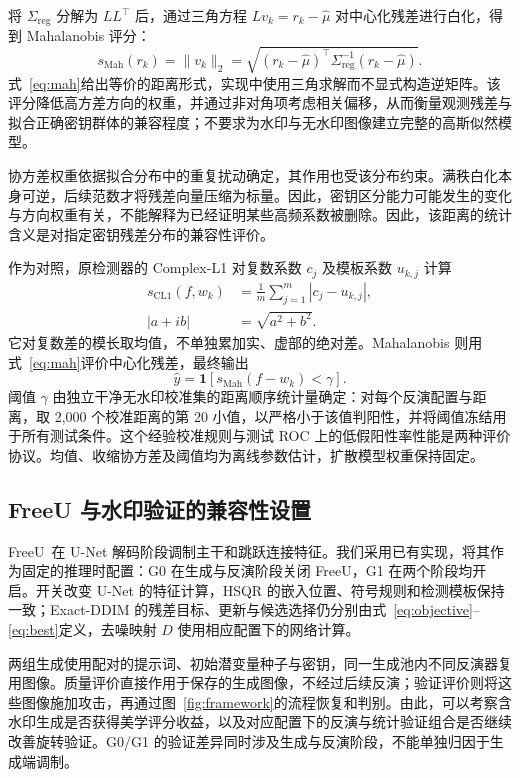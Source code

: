 \documentclass[10pt,twocolumn,letterpaper]{article}
\begin{document}
将 $\Sigma_{\mathrm{reg}}$ 分解为 $LL^\top$ 后，通过三角方程 $Lv_k=r_k-\widehat\mu$ 对中心化残差进行白化，得到 Mahalanobis 评分：
\begin{equation}s_{\mathrm{Mah}}(r_k)=\|v_k\|_2=\sqrt{(r_k-\widehat\mu)^\top\Sigma_{\mathrm{reg}}^{-1}(r_k-\widehat\mu)}.\label{eq:mah}\end{equation}
式~\eqref{eq:mah}给出等价的距离形式，实现中使用三角求解而不显式构造逆矩阵。该评分降低高方差方向的权重，并通过非对角项考虑相关偏移，从而衡量观测残差与拟合正确密钥群体的兼容程度；不要求为水印与无水印图像建立完整的高斯似然模型。

协方差权重依据拟合分布中的重复扰动确定，其作用也受该分布约束。满秩白化本身可逆，后续范数才将残差向量压缩为标量。因此，密钥区分能力可能发生的变化与方向权重有关，不能解释为已经证明某些高频系数被删除。因此，该距离的统计含义是对指定密钥残差分布的兼容性评价。


作为对照，原检测器的 Complex-L1 对复数系数 $c_j$ 及模板系数 $u_{k,j}$ 计算
\begin{equation}\begin{aligned}
s_{\mathrm{CL1}}(f,w_k)&=\frac1m\sum_{j=1}^m|c_j-u_{k,j}|,\\
|a+ib|&=\sqrt{a^2+b^2}.
\end{aligned}\label{eq:cl1}\end{equation}
它对复数差的模长取均值，不单独累加实、虚部的绝对差。Mahalanobis 则用式~\eqref{eq:mah}评价中心化残差，最终输出
\begin{equation}\widehat y=\mathbf1[s_{\mathrm{Mah}}(f-w_k)<\gamma].\label{eq:decision}\end{equation}
阈值 $\gamma$ 由独立干净无水印校准集的距离顺序统计量确定：对每个反演配置与距离，取 2,000 个校准距离的第 20 小值，以严格小于该值判阳性，并将阈值冻结用于所有测试条件。这个经验校准规则与测试 ROC 上的低假阳性率性能是两种评价协议。均值、收缩协方差及阈值均为离线参数估计，扩散模型权重保持固定。

\subsection{FreeU 与水印验证的兼容性设置}
FreeU~\cite{freeu2024}在 U-Net 解码阶段调制主干和跳跃连接特征。我们采用已有实现，将其作为固定的推理时配置：G0 在生成与反演阶段关闭 FreeU，G1 在两个阶段均开启。开关改变 U-Net 的特征计算，HSQR 的嵌入位置、符号规则和检测模板保持一致；Exact-DDIM 的残差目标、更新与候选选择仍分别由式~\eqref{eq:objective}--\eqref{eq:best}定义，去噪映射 $D$ 使用相应配置下的网络计算。

两组生成使用配对的提示词、初始潜变量种子与密钥，同一生成池内不同反演器复用图像。质量评价直接作用于保存的生成图像，不经过后续反演；验证评价则将这些图像施加攻击，再通过图~\ref{fig:framework}的流程恢复和判别。由此，可以考察含水印生成是否获得美学评分收益，以及对应配置下的反演与统计验证组合是否继续改善旋转验证。G0/G1 的验证差异同时涉及生成与反演阶段，不能单独归因于生成端调制。
\end{document}
